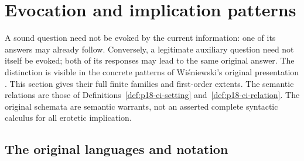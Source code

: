 \section{Evocation and implication patterns}
\label{sec:p18-erotetic-patterns-and-composition}

A sound question need not be evoked by the current information: one of its
answers may already follow. Conversely, a legitimate auxiliary question need
not itself be evoked; both of its responses may lead to the same original
answer. The distinction is visible in the concrete patterns of
Wi\'sniewski's original presentation
\cite[secs.~6,8--9.1]{Wisniewski2001QuestionsInferences}.
This section gives their full finite families and first-order extents.
The semantic relations are those of
Definitions~\ref{def:p18-ei-setting} and~\ref{def:p18-ei-relation}.
The original schemata are semantic warrants, not an asserted complete
syntactic calculus for all erotetic implication.

\subsection{The original languages and notation}

